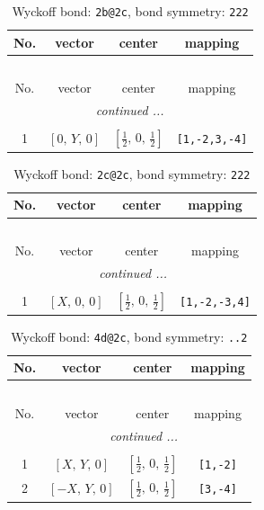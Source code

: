 \documentclass[fleqn,8pt]{jsarticle}
\begin{document}
\begin{longtable}{cccc}
\caption{Wyckoff bond: {\tt 2b@2c}, bond symmetry: {\tt 222}}
 \\
 \hline \hline
No. & vector & center & mapping \\ \hline \endfirsthead

\multicolumn{3}{l}{\tablename\ \thetable{}} \\
 \hline \hline
No. & vector & center & mapping \\ \hline \endhead

 \hline \hline
\multicolumn{3}{r}{\footnotesize\it continued ...} \\ \endfoot

 \hline \hline
\multicolumn{3}{r}{} \\ \endlastfoot

1 & $\left[ 0,\, Y,\, 0 \right]$ & $\left[ \frac{1}{2},\, 0,\, \frac{1}{2} \right]$ & {\tt [1,-2,3,-4]} \\
\end{longtable}
\renewcommand{\arraystretch}{1.2}
\begin{longtable}{cccc}
\caption{Wyckoff bond: {\tt 2c@2c}, bond symmetry: {\tt 222}}
 \\
 \hline \hline
No. & vector & center & mapping \\ \hline \endfirsthead

\multicolumn{3}{l}{\tablename\ \thetable{}} \\
 \hline \hline
No. & vector & center & mapping \\ \hline \endhead

 \hline \hline
\multicolumn{3}{r}{\footnotesize\it continued ...} \\ \endfoot

 \hline \hline
\multicolumn{3}{r}{} \\ \endlastfoot

1 & $\left[ X,\, 0,\, 0 \right]$ & $\left[ \frac{1}{2},\, 0,\, \frac{1}{2} \right]$ & {\tt [1,-2,-3,4]} \\
\end{longtable}
\renewcommand{\arraystretch}{1.2}
\begin{longtable}{cccc}
\caption{Wyckoff bond: {\tt 4d@2c}, bond symmetry: {\tt ..2}}
 \\
 \hline \hline
No. & vector & center & mapping \\ \hline \endfirsthead

\multicolumn{3}{l}{\tablename\ \thetable{}} \\
 \hline \hline
No. & vector & center & mapping \\ \hline \endhead

 \hline \hline
\multicolumn{3}{r}{\footnotesize\it continued ...} \\ \endfoot

 \hline \hline
\multicolumn{3}{r}{} \\ \endlastfoot

1 & $\left[ X,\, Y,\, 0 \right]$ & $\left[ \frac{1}{2},\, 0,\, \frac{1}{2} \right]$ & {\tt [1,-2]} \\ \hline
2 & $\left[ - X,\, Y,\, 0 \right]$ & $\left[ \frac{1}{2},\, 0,\, \frac{1}{2} \right]$ & {\tt [3,-4]} \\
\end{longtable}
\end{document}
